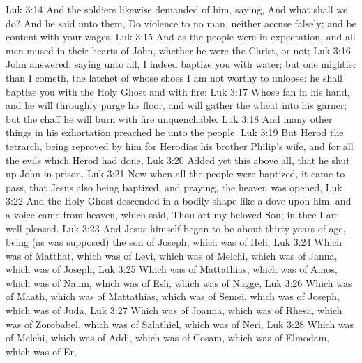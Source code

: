 \vs Luk 3:14 And the soldiers likewise demanded of him, saying, And what shall we do? And he said unto them, Do violence to no man, neither accuse  falsely; and be content with your wages.
\vs Luk 3:15 And as the people were in expectation, and all men mused in their hearts of John, whether he were the Christ, or not;
\vs Luk 3:16 John answered, saying unto  all, I indeed baptize you with water; but one mightier than I cometh, the latchet of whose shoes I am not worthy to unloose: he shall baptize you with the Holy Ghost and with fire:
\vs Luk 3:17 Whose fan  in his hand, and he will throughly purge his floor, and will gather the wheat into his garner; but the chaff he will burn with fire unquenchable.
\vs Luk 3:18 And many other things in his exhortation preached he unto the people.
\vs Luk 3:19 But Herod the tetrarch, being reproved by him for Herodias his brother Philip's wife, and for all the evils which Herod had done,
\vs Luk 3:20 Added yet this above all, that he shut up John in prison.
\vs Luk 3:21 Now when all the people were baptized, it came to pass, that Jesus also being baptized, and praying, the heaven was opened,
\vs Luk 3:22 And the Holy Ghost descended in a bodily shape like a dove upon him, and a voice came from heaven, which said, Thou art my beloved Son; in thee I am well pleased.
\vs Luk 3:23 And Jesus himself began to be about thirty years of age, being (as was supposed) the son of Joseph, which was  of Heli,
\vs Luk 3:24 Which was  of Matthat, which was  of Levi, which was  of Melchi, which was  of Janna, which was  of Joseph,
\vs Luk 3:25 Which was  of Mattathias, which was  of Amos, which was  of Naum, which was  of Esli, which was  of Nagge,
\vs Luk 3:26 Which was  of Maath, which was  of Mattathias, which was  of Semei, which was  of Joseph, which was  of Juda,
\vs Luk 3:27 Which was  of Joanna, which was  of Rhesa, which was  of Zorobabel, which was  of Salathiel, which was  of Neri,
\vs Luk 3:28 Which was  of Melchi, which was  of Addi, which was  of Cosam, which was  of Elmodam, which was  of Er,
